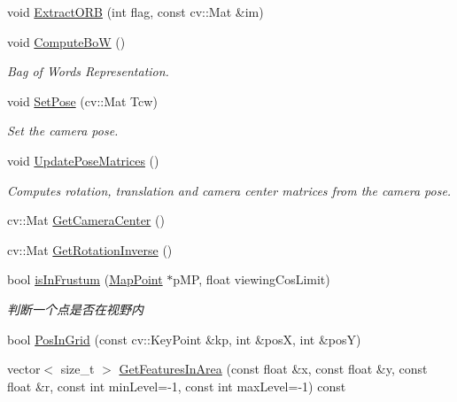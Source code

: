 \begin{DoxyCompactItemize}
\item 
void \mbox{\hyperlink{class_o_r_b___s_l_a_m2_1_1_frame_a626aef981e9fd9caff63bf93f1abf47f}{Extract\+O\+RB}} (int flag, const cv\+::\+Mat \&im)
\item 
void \mbox{\hyperlink{class_o_r_b___s_l_a_m2_1_1_frame_ac748d2318f9a409406dba4910ff5ef8e}{Compute\+BoW}} ()
\begin{DoxyCompactList}\small\item\em Bag of Words Representation. \end{DoxyCompactList}\item 
void \mbox{\hyperlink{class_o_r_b___s_l_a_m2_1_1_frame_a95cf2ea68735ef3e8c2d820eada11bf4}{Set\+Pose}} (cv\+::\+Mat Tcw)
\begin{DoxyCompactList}\small\item\em Set the camera pose. \end{DoxyCompactList}\item 
void \mbox{\hyperlink{class_o_r_b___s_l_a_m2_1_1_frame_a0a18d3024a23f6fa2cab9c7d987598c2}{Update\+Pose\+Matrices}} ()
\begin{DoxyCompactList}\small\item\em Computes rotation, translation and camera center matrices from the camera pose. \end{DoxyCompactList}\item 
cv\+::\+Mat \mbox{\hyperlink{class_o_r_b___s_l_a_m2_1_1_frame_a48c8983df3a521ed7439d9654b28e390}{Get\+Camera\+Center}} ()
\item 
cv\+::\+Mat \mbox{\hyperlink{class_o_r_b___s_l_a_m2_1_1_frame_a96ec2c272f2ecea3f94b8472add80478}{Get\+Rotation\+Inverse}} ()
\item 
bool \mbox{\hyperlink{class_o_r_b___s_l_a_m2_1_1_frame_a0929e100e3380dba1baba12dfa8904c4}{is\+In\+Frustum}} (\mbox{\hyperlink{class_o_r_b___s_l_a_m2_1_1_map_point}{Map\+Point}} $\ast$p\+MP, float viewing\+Cos\+Limit)
\begin{DoxyCompactList}\small\item\em 判断一个点是否在视野内 \end{DoxyCompactList}\item 
bool \mbox{\hyperlink{class_o_r_b___s_l_a_m2_1_1_frame_ae2bc4b1482d2010511da5423d298c9bd}{Pos\+In\+Grid}} (const cv\+::\+Key\+Point \&kp, int \&posX, int \&posY)
\item 
vector$<$ size\+\_\+t $>$ \mbox{\hyperlink{class_o_r_b___s_l_a_m2_1_1_frame_a922a340f438ed0ddd2d7d2a9f95872b6}{Get\+Features\+In\+Area}} (const float \&x, const float \&y, const float \&r, const int min\+Level=-\/1, const int max\+Level=-\/1) const

\end{DoxyCompactItemize}
